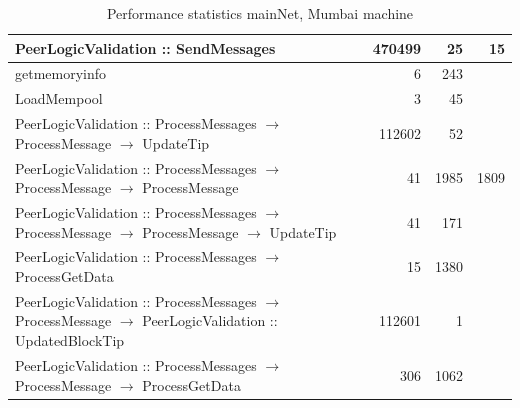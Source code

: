 \documentclass{article}
\begin{document}
\begin{table}
\begin{longtable}{P{8cm}|r|r|r}
		PeerLogicValidation :: SendMessages& 470499& 25&15\\\hline
		getmemoryinfo& 6& 243&\\\hline
		LoadMempool& 3& 45&\\\hline
		PeerLogicValidation :: ProcessMessages $\to$ ProcessMessage $\to$ UpdateTip& 112602& 52&\\\hline
		PeerLogicValidation :: ProcessMessages $\to$ ProcessMessage $\to$ ProcessMessage& 41& 1985&1809\\\hline
		PeerLogicValidation :: ProcessMessages $\to$ ProcessMessage $\to$ ProcessMessage $\to$ UpdateTip& 41& 171&\\\hline
		PeerLogicValidation :: ProcessMessages $\to$ ProcessGetData& 15& 1380&\\\hline
		PeerLogicValidation :: ProcessMessages $\to$ ProcessMessage $\to$ PeerLogicValidation :: UpdatedBlockTip& 112601& 1&\\\hline
		PeerLogicValidation :: ProcessMessages $\to$ ProcessMessage $\to$ ProcessGetData& 306& 1062&\\\hline
	\end{longtable}
	\caption{\label{tablePerformanceMumbai} Performance statistics mainNet, Mumbai machine}
\end{table}
\end{document}
